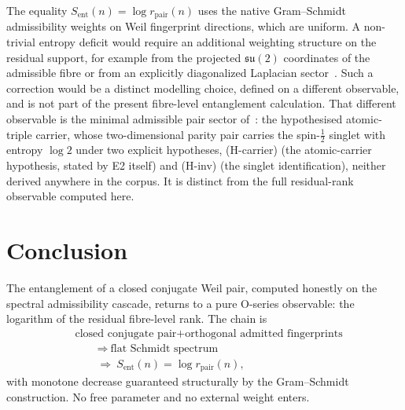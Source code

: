 \documentclass[11pt]{article}
\newcommand{\Sent}{S_{\mathrm{ent}}}
\newcommand{\rpair}{r_{\mathrm{pair}}}
\begin{document}
    The equality $\Sent(n)=\log \rpair(n)$ uses the native Gram--Schmidt admissibility weights on Weil
    fingerprint directions, which are uniform.
    A non-trivial entropy deficit would require an additional weighting structure on the residual support, for
    example from the projected $\mathfrak{su}(2)$ coordinates of the admissible fibre or from an explicitly
    diagonalized Laplacian sector~\cite{Beau2026a31,Beau2026a33}.
    Such a correction would be a distinct modelling choice, defined on a different observable, and is not part
    of the present fibre-level entanglement calculation.
    That different observable is the minimal admissible pair sector of~\cite{Beau2026ent2}: the
    hypothesised atomic-triple carrier, whose two-dimensional parity pair carries the spin-$\tfrac12$
    singlet with entropy $\log 2$ under two explicit hypotheses, (H-carrier) (the atomic-carrier
    hypothesis, stated by E2 itself) and (H-inv) (the singlet identification), neither derived
    anywhere in the corpus.
    It is distinct from the full residual-rank observable computed here.

  \section{Conclusion}
    \label{sec:conclusion}

    The entanglement of a closed conjugate Weil pair, computed honestly on the spectral admissibility cascade,
    returns to a pure O-series observable: the logarithm of the residual fibre-level rank.
    The chain is
    \[
      \begin{aligned}
        &\text{closed conjugate pair}+\text{orthogonal admitted fingerprints}\\
        &\qquad\Longrightarrow\ \text{flat Schmidt spectrum}\\
        &\qquad\Longrightarrow\ \Sent(n)=\log \rpair(n),
      \end{aligned}
    \]
    with monotone decrease guaranteed structurally by the Gram--Schmidt construction.
    No free parameter and no external weight enters.
\end{document}
